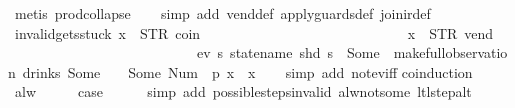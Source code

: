 \begin{isabellebody}
\ {\isacharparenleft}metis\ prod{\isachardot}collapse{\isacharparenright}\isanewline
\ \ \isamarkupfalse%
\ {\isacharparenleft}simp\ add{\isacharcolon}\ vend{\isacharunderscore}def\ apply{\isacharunderscore}guards{\isacharunderscore}def\ join{\isacharunderscore}ir{\isacharunderscore}def{\isacharparenright}%
\endisatagproof
{\isafoldproof}%
%
\isadelimproof
\isanewline
%
\endisadelimproof
\isanewline
{}\isamarkupfalse%
\ invalid{\isacharunderscore}gets{\isacharunderscore}stuck{\isacharcolon}\ {\isachardoublequoteopen}x{}\ {\isasymnoteq}\ {\isacharparenleft}STR\ {\isacharprime}{\isacharprime}coin{\isacharprime}{\isacharprime}{\isacharcomma}\ {\isacharbrackleft}{\isacharbrackright}{\isacharparenright}\ {\isasymLongrightarrow}\isanewline
\ \ \ \ \ \ \ \ \ \ \ \ \ \ \ \ \ \ \ \ \ \ \ \ \ \ \ x{}\ {\isasymnoteq}\ {\isacharparenleft}STR\ {\isacharprime}{\isacharprime}vend{\isacharprime}{\isacharprime}{\isacharcomma}\ {\isacharbrackleft}{\isacharbrackright}{\isacharparenright}\ {\isasymLongrightarrow}\isanewline
\ \ \ \ \ \ \ \ \ \ \ \ \ \ \ \ \ \ \ \ \ \ \ \ \ \ \ {\isasymnot}ev\ {\isacharparenleft}{\isasymlambda}s{\isachardot}\ statename\ {\isacharparenleft}shd\ s{\isacharparenright}\ {\isacharequal}\ Some\ {}{\isacharparenright}\ {\isacharparenleft}make{\isacharunderscore}full{\isacharunderscore}observation\ drinks\ {\isacharparenleft}Some\ {}{\isacharparenright}\ {\isacharless}{}\ {\isachardollar}{\isacharcolon}{\isacharequal}\ Some\ {\isacharparenleft}Num\ {}{\isacharparenright}{\isachargreater}\ p\ {\isacharparenleft}x{}\ {\isacharhash}{\isacharhash}\ x{}{\isacharparenright}{\isacharparenright}{\isachardoublequoteclose}\isanewline
%
\isadelimproof
\ \ %
\endisadelimproof
%
\isatagproof
{}\isamarkupfalse%
\ {\isacharparenleft}simp\ add{\isacharcolon}\ not{\isacharunderscore}ev{\isacharunderscore}iff{\isacharparenright}\isanewline
{}\isamarkupfalse%
{\isacharparenleft}coinduction{\isacharparenright}\isanewline
\ \ \isamarkupfalse%
\ alw\isanewline
\ \ \isamarkupfalse%
\ \isamarkupfalse%
\ {\isacharquery}case\isanewline
\ \ \ \ \isamarkupfalse%
\ {\isacharparenleft}simp\ add{\isacharcolon}\ possible{\isacharunderscore}steps{\isacharunderscore}{}{\isacharunderscore}invalid\ alw{\isacharunderscore}not{\isacharunderscore}some\ ltl{\isacharunderscore}step{\isacharunderscore}alt{\isacharparenright}\isanewline
{}\isamarkupfalse%

\end{isabellebody}
